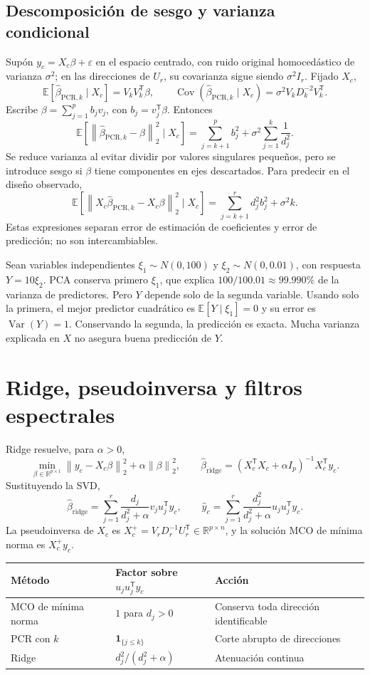 \documentclass[11pt,a4paper]{article}
\newcommand{\R}{\mathbb R}
\newcommand{\E}{\mathbb E}
\newcommand{\ind}{\mathbf 1}
\newcommand{\T}{^{\mathsf T}}
\newcommand{\norm}[1]{\left\lVert #1\right\rVert}
\DeclareMathOperator{\Var}{Var}
\DeclareMathOperator{\Cov}{Cov}
\theoremstyle{definition}
\begin{document}
\subsection{Descomposición de sesgo y varianza condicional}
Supón $y_c=X_c\beta+\varepsilon$ en el espacio centrado, con ruido original homocedástico de varianza $\sigma^2$; en las direcciones de $U_r$, su covarianza sigue siendo $\sigma^2I_r$. Fijado $X_c$,
\[
\E[\widehat\beta_{\mathrm{PCR},k}\mid X_c]=V_kV_k\T\beta,\qquad
\Cov(\widehat\beta_{\mathrm{PCR},k}\mid X_c)=\sigma^2V_kD_k^{-2}V_k\T.
\]
Escribe $\beta=\sum_{j=1}^p b_jv_j$, con $b_j=v_j\T\beta$. Entonces
\[
\E[\norm{\widehat\beta_{\mathrm{PCR},k}-\beta}_2^2\mid X_c]
=\sum_{j=k+1}^pb_j^2+\sigma^2\sum_{j=1}^k\frac1{d_j^2}.
\]
Se reduce varianza al evitar dividir por valores singulares pequeños, pero se introduce sesgo si $\beta$ tiene componentes en ejes descartados. Para predecir en el diseño observado,
\[
\E[\norm{X_c\widehat\beta_{\mathrm{PCR},k}-X_c\beta}_2^2\mid X_c]
=\sum_{j=k+1}^rd_j^2b_j^2+\sigma^2k.
\]
Estas expresiones separan error de estimación de coeficientes y error de predicción; no son intercambiables.
\begin{ejemplo}
Sean variables independientes $\xi_1\sim N(0,100)$ y $\xi_2\sim N(0,0.01)$, con respuesta $Y=10\xi_2$. PCA conserva primero $\xi_1$, que explica $100/100.01\approx99.990\%$ de la varianza de predictores. Pero $Y$ depende solo de la segunda variable. Usando solo la primera, el mejor predictor cuadrático es $\E[Y\mid\xi_1]=0$ y su error es $\Var(Y)=1$. Conservando la segunda, la predicción es exacta. Mucha varianza explicada en $X$ no asegura buena predicción de $Y$.
\end{ejemplo}

\section{Ridge, pseudoinversa y filtros espectrales}
Ridge resuelve, para $\alpha>0$,
\[
\min_{\beta\in\R^{p\times1}}\norm{y_c-X_c\beta}_2^2+\alpha\norm\beta_2^2,
\qquad\widehat\beta_{\mathrm{ridge}}=(X_c\T X_c+\alpha I_p)^{-1}X_c\T y_c.
\]
Sustituyendo la SVD,
\[
\widehat\beta_{\mathrm{ridge}}=\sum_{j=1}^r\frac{d_j}{d_j^2+\alpha}v_ju_j\T y_c,
\qquad
\widehat y_c=\sum_{j=1}^r\frac{d_j^2}{d_j^2+\alpha}u_ju_j\T y_c.
\]
La pseudoinversa de $X_c$ es $X_c^+=V_rD_r^{-1}U_r\T\in\R^{p\times n}$, y la solución MCO de mínima norma es $X_c^+y_c$.
\begin{center}\small
\begin{tabular}{lll}\toprule
Método & Factor sobre $u_ju_j\T y_c$ & Acción\\\midrule
MCO de mínima norma & $1$ para $d_j>0$ & Conserva toda dirección identificable\\
PCR con $k$ & $\ind_{\{j\le k\}}$ & Corte abrupto de direcciones\\
Ridge & $d_j^2/(d_j^2+\alpha)$ & Atenuación continua\\\bottomrule
\end{tabular}\end{center}
\end{document}
